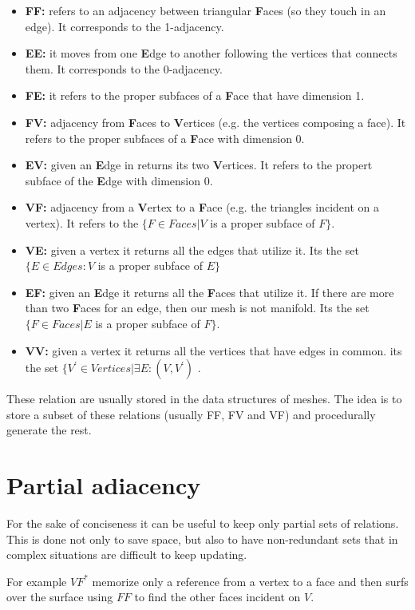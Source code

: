 \begin{itemize}
    \item \textbf{FF:} refers to an adjacency between triangular \textbf{F}aces (so they touch in an edge). It corresponds to the 1-adjacency.
    
    \item \textbf{EE:} it moves from one \textbf{E}dge to another following the vertices that connects them. It corresponds to the 0-adjacency.

    \item \textbf{FE:} it refers to the proper subfaces of a \textbf{F}ace that have dimension 1.
    
    \item \textbf{FV:} adjacency from \textbf{F}aces to \textbf{V}ertices (e.g. the vertices composing a face). It refers to the proper subfaces of a \textbf{F}ace with dimension 0.

    \item \textbf{EV:} given an \textbf{E}dge in returns its two \textbf{V}ertices. It refers to the propert subface of the \textbf{E}dge with dimension 0.
    
    \item \textbf{VF:} adjacency from a \textbf{V}ertex to a \textbf{F}ace (e.g. the triangles incident on a vertex). It refers to the $\{F \in Faces | V $ is a proper subface of $F\}$.

    \item \textbf{VE:} given a vertex it returns all the edges that utilize it. Its the set $\{ E \in Edges : V $ is a proper subface of $E \}$

    \item \textbf{EF:} given an \textbf{E}dge it returns all the \textbf{F}aces that utilize it. If there are more than two \textbf{F}aces for an edge, then our mesh is not manifold. Its the set $\{F \in Faces | E$ is a proper subface of $F \}$.

    \item \textbf{VV:} given a vertex it returns all the vertices that have edges in common. its the set $\{ V^{'} \in Vertices | \exists E:(V,V^{'})$ .
\end{itemize}

These relation are usually stored in the data structures of meshes. The idea is to store a subset of these relations (usually FF, FV and VF) and procedurally generate the rest.

\section{Partial adiacency}
For the sake of conciseness it can be useful to keep only partial sets of relations. This is done not only to save space, but also to have non-redundant sets that in complex situations are difficult to keep updating.\par
For example $VF^{*}$ memorize only a reference from a vertex to a face and then surfs over the surface using $FF$ to find the other faces incident on $V$.

